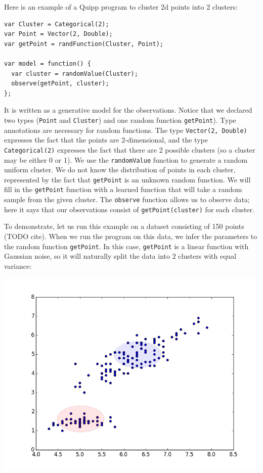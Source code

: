 \documentclass{article}
\begin{document}
  Here is an example of a Quipp program to cluster 2d points into 2 clusters:

  \begin{lstlisting}
var Cluster = Categorical(2);
var Point = Vector(2, Double);
var getPoint = randFunction(Cluster, Point);

var model = function() {
  var cluster = randomValue(Cluster);
  observe(getPoint, cluster);
};
  \end{lstlisting}

  It is written as a generative model for the observations.  Notice that
  we declared two types (\texttt{Point} and \texttt{Cluster}) and one
  random function \texttt{getPoint}).  Type annotations are necessary for random
  functions.  The type \texttt{Vector(2, Double)} expresses the fact that the
  points are 2-dimensional, and the type \texttt{Categorical(2)} expresses the
  fact that there are 2 possible clusters (so a cluster may be either 0 or 1).
  We use the \texttt{randomValue} function to generate a random uniform cluster. We do not know
  the distribution of points in each cluster, represented by the fact that \texttt{getPoint}
  is an unknown random function.  We will fill in the
  \texttt{getPoint} function with a learned function that will take a random
  sample from the given cluster.  The \texttt{observe} function allows us to
  observe data; here it says that our observations consist of \texttt{getPoint(cluster)} for
  each cluster.


  To demonstrate, let us run this example on a dataset consisting of 150 points (TODO cite).  When we run the program on this data, we infer the parameters to the random function \texttt{getPoint}.
  In this case, \texttt{getPoint} is a linear function with Gaussian noise, so it will naturally
  split the data into 2 clusters with equal variance:
  \begin{center}
    \includegraphics[scale=0.5]{../plots/irisclusters_orig.png}
  \end{center}
\end{document}
